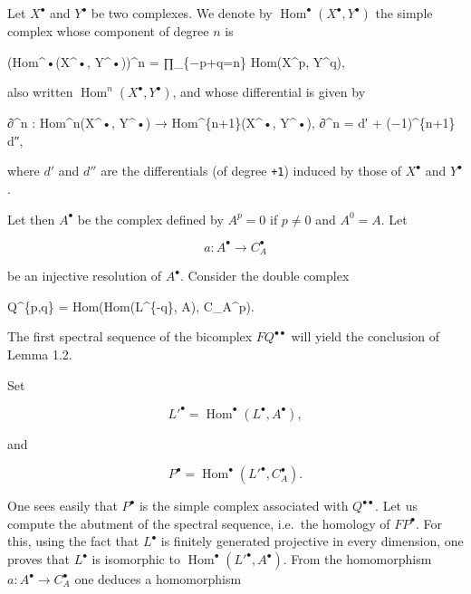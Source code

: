 \documentclass[
  11pt,
  a4paper,
]{book}
\newenvironment{Shaded}{}{}
\newcommand{\NormalTok}[1]{#1}
\begin{document}
Let \(X^{\bullet}\) and \(Y^{\bullet}\) be two complexes. We denote by
\(\operatorname{Hom}^{\bullet}(X^{\bullet},
Y^{\bullet})\) the simple complex whose component of degree \(n\) is

\begin{Shaded}
\begin{Highlighting}[]
\NormalTok{(Hom\^{}•(X\^{}•, Y\^{}•))\^{}n = ∏\_\{−p+q=n\} Hom(X\^{}p, Y\^{}q),}
\end{Highlighting}
\end{Shaded}

also written \(\operatorname{Hom}^{n}(X^{\bullet}, Y^{\bullet})\), and
whose differential is given by

\begin{Shaded}
\begin{Highlighting}[]
\NormalTok{∂\^{}n : Hom\^{}n(X\^{}•, Y\^{}•) → Hom\^{}\{n+1\}(X\^{}•, Y\^{}•),}
\NormalTok{∂\^{}n = d′ + (−1)\^{}\{n+1\} d″,}
\end{Highlighting}
\end{Shaded}

where \(d'\) and \(d''\) are the differentials (of degree \texttt{+1})
induced by those of \(X^{\bullet}\) and \(Y^{\bullet}\).

Let then \(A^{\bullet}\) be the complex defined by \(A^{p} = 0\) if
\(p \neq 0\) and \(A^{0} = A\). Let

\[ a : A^{\bullet} \to C^{\bullet}_{A} \]

be an injective resolution of \(A^{\bullet}\). Consider the double
complex

\begin{Shaded}
\begin{Highlighting}[]
\NormalTok{Q\^{}\{p,q\} = Hom(Hom(L\^{}\{{-}q\}, A), C\_A\^{}p).}
\end{Highlighting}
\end{Shaded}

The first spectral sequence of the bicomplex \(F Q^{\bullet\bullet}\)
will yield the conclusion of Lemma 1.2.

Set

\[ L'^{\bullet} = \operatorname{Hom}^{\bullet}(L^{\bullet}, A^{\bullet}), \]

and

\[ P^{\bullet} = \operatorname{Hom}^{\bullet}(L'^{\bullet}, C^{\bullet}_{A}). \]

One sees easily that \(P^{\bullet}\) is the simple complex associated
with \(Q^{\bullet\bullet}\). Let us compute the abutment of the spectral
sequence, i.e.~the homology of \(F P^{\bullet}\). For this, using the
fact that \(L^{\bullet}\) is finitely generated projective in every
dimension, one proves that \(L^{\bullet}\) is isomorphic to
\(\operatorname{Hom}^{\bullet}(L'^{\bullet}, A^{\bullet})\). From the
homomorphism \(a : A^{\bullet} \to C^{\bullet}_{A}\) one deduces a
homomorphism
\end{document}
